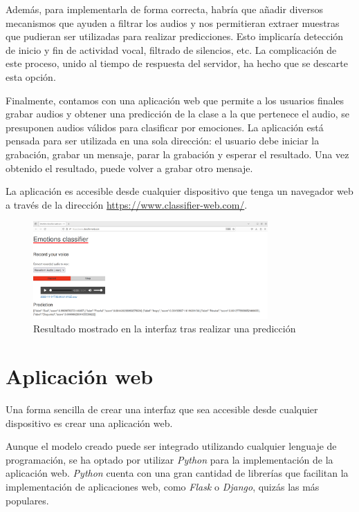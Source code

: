 Además, para implementarla de forma correcta, habría que añadir diversos mecanismos que ayuden a filtrar los audios y nos permitieran extraer muestras que pudieran ser utilizadas para realizar predicciones.
Esto implicaría detección de inicio y fin de actividad vocal, filtrado de silencios, etc.
La complicación de este proceso, unido al tiempo de respuesta del servidor, ha hecho que se descarte esta opción.

Finalmente, contamos con una aplicación web que permite a los usuarios finales grabar audios y obtener una predicción de la clase a la que pertenece el audio, se presuponen audios válidos para clasificar por emociones.
La aplicación está pensada para ser utilizada en una sola dirección: el usuario debe iniciar la grabación, grabar un mensaje, parar la grabación y esperar el resultado.
Una vez obtenido el resultado, puede volver a grabar otro mensaje.

La aplicación es accesible desde cualquier dispositivo que tenga un navegador web a través de la dirección \url{https://www.classifier-web.com/}.

\begin{figure}[H]
    \centering
    \includegraphics[width=0.8\textwidth]{cap3/images/interfaz-web.png}
    \caption{Resultado mostrado en la interfaz tras realizar una predicción}
    \label{fig:interfaz-web}
\end{figure}


\section{Aplicación web}
Una forma sencilla de crear una interfaz que sea accesible desde cualquier dispositivo es crear una aplicación web.

Aunque el modelo creado puede ser integrado utilizando cualquier lenguaje de programación, se ha optado por utilizar \textit{Python} para la implementación de la aplicación web.
\textit{Python} cuenta con una gran cantidad de librerías que facilitan la implementación de aplicaciones web, como \textit{Flask} o \textit{Django}, quizás las más populares.

